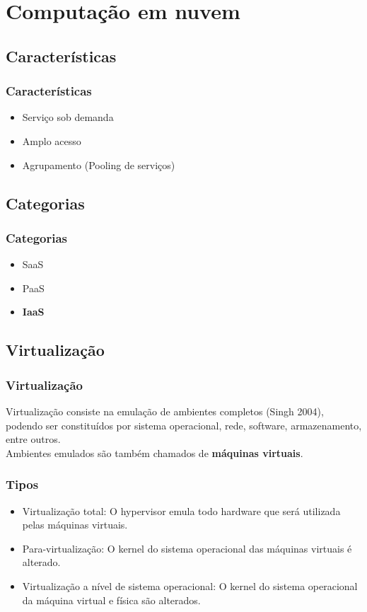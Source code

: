 \documentclass{beamer}
\begin{document}
    \section{Computação em nuvem}
    \subsection{Características}
    \begin{frame}
      \frametitle{Características}
      \begin{itemize}
       \item Serviço sob demanda
       \item Amplo acesso
       \item Agrupamento (Pooling de serviços)
      \end{itemize}
    \end{frame}

    \subsection{Categorias}
    \begin{frame}
      \frametitle{Categorias}
      \begin{itemize}
       \item SaaS
       \item PaaS
       \item \textbf{IaaS}
      \end{itemize}
    \end{frame}

    \subsection{Virtualização}
    \begin{frame}
     \frametitle{Virtualização}
     Virtualização consiste na emulação de ambientes completos (Singh 2004), podendo ser constituídos por sistema operacional, rede, software, armazenamento, entre outros.\\
     Ambientes emulados são também chamados de \textbf{máquinas virtuais}.
    \end{frame}

    \begin{frame}
     \frametitle{Tipos}
     \begin{itemize}
      \item Virtualização total: O hypervisor emula todo hardware que será utilizada pelas máquinas virtuais.
      \item Para-virtualização: O kernel do sistema operacional das máquinas virtuais é alterado.
      \item Virtualização a nível de sistema operacional: O kernel do sistema operacional da máquina virtual e física são alterados.
     \end{itemize}
    \end{frame}
\end{document}
